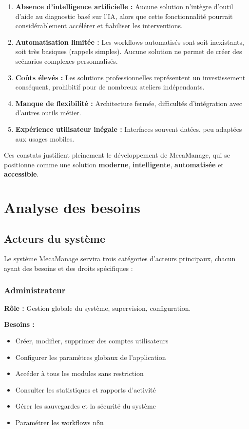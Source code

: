 \begin{enumerate}
    \item \textbf{Absence d'intelligence artificielle :} Aucune solution n'intègre d'outil d'aide au diagnostic basé sur l'IA, alors que cette fonctionnalité pourrait considérablement accélérer et fiabiliser les interventions.
    
    \item \textbf{Automatisation limitée :} Les workflows automatisés sont soit inexistants, soit très basiques (rappels simples). Aucune solution ne permet de créer des scénarios complexes personnalisés.
    
    \item \textbf{Coûts élevés :} Les solutions professionnelles représentent un investissement conséquent, prohibitif pour de nombreux ateliers indépendants.
    
    \item \textbf{Manque de flexibilité :} Architecture fermée, difficultés d'intégration avec d'autres outils métier.
    
    \item \textbf{Expérience utilisateur inégale :} Interfaces souvent datées, peu adaptées aux usages mobiles.
\end{enumerate}

Ces constats justifient pleinement le développement de MecaManage, qui se positionne comme une solution \textbf{moderne}, \textbf{intelligente}, \textbf{automatisée} et \textbf{accessible}.

\section{Analyse des besoins}

\subsection{Acteurs du système}

Le système MecaManage servira trois catégories d'acteurs principaux, chacun ayant des besoins et des droits spécifiques :

\subsubsection{Administrateur}

\textbf{Rôle :} Gestion globale du système, supervision, configuration.

\textbf{Besoins :}
\begin{itemize}
    \item Créer, modifier, supprimer des comptes utilisateurs
    \item Configurer les paramètres globaux de l'application
    \item Accéder à tous les modules sans restriction
    \item Consulter les statistiques et rapports d'activité
    \item Gérer les sauvegardes et la sécurité du système
    \item Paramétrer les workflows n8n
\end{itemize}

